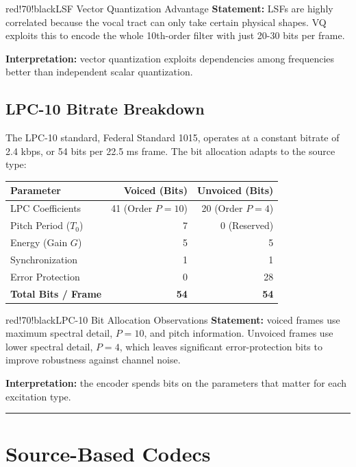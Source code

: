 \begin{calloutbox}{red!70!black}{LSF Vector Quantization Advantage}
\textbf{Statement:} LSFs are highly correlated because the vocal tract can only take certain physical shapes. VQ exploits this to encode the whole 10th-order filter with just 20-30 bits per frame.

\textbf{Interpretation:} vector quantization exploits dependencies among frequencies better than independent scalar quantization.
\end{calloutbox}

\subsection{LPC-10 Bitrate Breakdown}

The LPC-10 standard, Federal Standard 1015, operates at a constant bitrate of 2.4 kbps, or 54 bits per 22.5 ms frame. The bit allocation adapts to the source type:

\begin{center}
\begin{tabular}{|l|r|r|}
\hline
\textbf{Parameter} & \textbf{Voiced (Bits)} & \textbf{Unvoiced (Bits)} \\ \hline
LPC Coefficients & 41 (Order $P = 10$) & 20 (Order $P = 4$) \\ \hline
Pitch Period ($T_0$) & 7 & 0 (Reserved) \\ \hline
Energy (Gain $G$) & 5 & 5 \\ \hline
Synchronization & 1 & 1 \\ \hline
Error Protection & 0 & 28 \\ \hline
\textbf{Total Bits / Frame} & \textbf{54} & \textbf{54} \\ \hline
\end{tabular}
\end{center}

\begin{calloutbox}{red!70!black}{LPC-10 Bit Allocation Observations}
\textbf{Statement:} voiced frames use maximum spectral detail, $P=10$, and pitch information. Unvoiced frames use lower spectral detail, $P=4$, which leaves significant error-protection bits to improve robustness against channel noise.

\textbf{Interpretation:} the encoder spends bits on the parameters that matter for each excitation type.
\end{calloutbox}

\bigskip\hrule\bigskip
\section{Source-Based Codecs}

